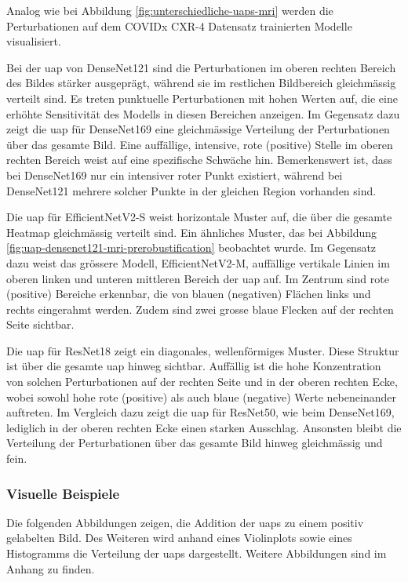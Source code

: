 Analog wie bei Abbildung \ref{fig:unterschiedliche-uaps-mri} werden die Perturbationen auf dem COVIDx CXR-4 Datensatz trainierten Modelle visualisiert.

Bei der \acrshort{uap} von DenseNet121 sind die Perturbationen im oberen rechten Bereich des Bildes stärker ausgeprägt, während sie im restlichen Bildbereich gleichmässig verteilt sind. Es treten punktuelle Perturbationen mit hohen Werten auf, die eine erhöhte Sensitivität des Modells in diesen Bereichen anzeigen. Im Gegensatz dazu zeigt die \acrshort{uap} für DenseNet169 eine gleichmässige Verteilung der Perturbationen über das gesamte Bild. Eine auffällige, intensive, rote (positive) Stelle im oberen rechten Bereich weist auf eine spezifische Schwäche hin. Bemerkenswert ist, dass bei DenseNet169 nur ein intensiver roter Punkt existiert, während bei DenseNet121 mehrere solcher Punkte in der gleichen Region vorhanden sind.

Die \acrshort{uap} für EfficientNetV2-S weist horizontale Muster auf, die über die gesamte Heatmap gleichmässig verteilt sind. Ein ähnliches Muster, das bei Abbildung \ref{fig:uap-densenet121-mri-prerobustification} beobachtet wurde. Im Gegensatz dazu weist das grössere Modell, EfficientNetV2-M, auffällige vertikale Linien im oberen linken und unteren mittleren Bereich der \acrshort{uap} auf. Im Zentrum sind rote (positive) Bereiche erkennbar, die von blauen (negativen) Flächen links und rechts eingerahmt werden. Zudem sind zwei grosse blaue Flecken auf der rechten Seite sichtbar.

Die \acrshort{uap} für ResNet18 zeigt ein diagonales, wellenförmiges Muster. Diese Struktur ist über die gesamte \acrshort{uap} hinweg sichtbar. Auffällig ist die hohe Konzentration von solchen Perturbationen auf der rechten Seite und in der oberen rechten Ecke, wobei sowohl hohe rote (positive) als auch blaue (negative) Werte nebeneinander auftreten. Im Vergleich dazu zeigt die \acrshort{uap} für ResNet50, wie beim DenseNet169, lediglich in der oberen rechten Ecke einen starken Ausschlag. Ansonsten bleibt die Verteilung der Perturbationen über das gesamte Bild hinweg gleichmässig und fein.

\newpage

\subsubsection{Visuelle Beispiele}
Die folgenden Abbildungen zeigen, die Addition der \acrshort{uap}s zu einem positiv gelabelten Bild. Des Weiteren wird anhand eines Violinplots sowie eines Histogramms die Verteilung der \acrshort{uap}s dargestellt. Weitere Abbildungen sind im Anhang zu finden. 

